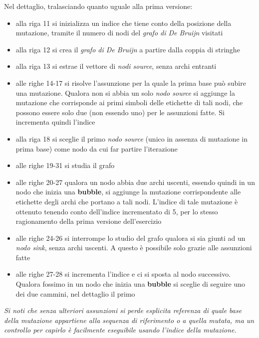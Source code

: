 \documentclass[a4paper,12pt, oneside]{book}
\begin{document}
Nel dettaglio, tralasciando quanto uguale alla prima versione:
\begin{itemize}
  \item alla riga 11 si inizializza un indice che tiene conto della posizione
  della mutazione, tramite il numero di nodi del \textit{grafo di De Bruijn}
  visitati 
  \item alla riga 12 si crea il \textit{grafo di De Bruijn} a partire dalla
  coppia di stringhe
  \item alla riga 13 si estrae il vettore di \textit{nodi source}, senza archi
  entranti
  \item alle righe 14-17 si risolve l'assunzione per la quale la prima base può
  subire una mutazione. Qualora non si abbia un solo \textit{nodo source} si
  aggiunge la mutazione che corrisponde ai primi simboli delle etichette di tali
  nodi, che possono essere solo due (non essendo uno) per le assunzioni fatte.
  Si incrementa quindi l'indice 
  \item alla riga 18 si sceglie il primo \textit{nodo source} (unico in assenza
  di mutazione in prima base) come nodo da cui far partire l'iterazione
  \item alle righe 19-31 si studia il grafo
  \item alle righe 20-27 qualora un nodo abbia due archi uscenti, essendo quindi
  in un nodo che inizia una \textbf{bubble}, si aggiunge la
  mutazione corrispondente alle etichette degli archi che portano a tali
  nodi. L'indice di tale mutazione è ottenuto tenendo conto dell'indice
  incrementato di 5, per lo stesso ragionamento della prima versione
  dell'esercizio
  \item alle righe 24-26 si interrompe lo studio del grafo qualora si sia giunti
  ad un \textit{nodo sink}, senza archi uscenti. A questo è possibile solo
  grazie alle assunzioni fatte 
  \item alle righe 27-28 si incrementa l'indice e ci si sposta al nodo
  successivo. Qualora fossimo in un nodo che inizia una \textbf{bubble} si
  sceglie di seguire uno dei due cammini, nel dettaglio il primo
\end{itemize}
\textit{Si noti che senza ulteriori assunzioni si perde esplicita referenza di
quale base della mutazione appartiene alla sequenza di riferimento o a quella
mutata, ma un controllo per capirlo è facilmente eseguibile usando l'indice
della mutazione.}
\end{document}

